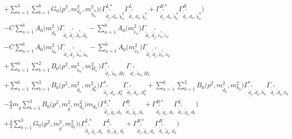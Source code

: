 \begin{itemize}
\begin{align}
 &+\sum_{a=1}^{3}\sum_{b=1}^{6}{G_0\Big(p^{2},m^2_{d_{{a}}},m^2_{\tilde{\chi}^0_{{b}}}\Big)} \Big({\Gamma^{L*}_{\check{\tilde{d}}^*_{{j}},d_{{a}},\tilde{\chi}^0_{{b}}}} {\Gamma^L_{\check{\tilde{d}}^*_{{i}},d_{{a}},\tilde{\chi}^0_{{b}}}}  + {\Gamma^{R*}_{\check{\tilde{d}}^*_{{j}},d_{{a}},\tilde{\chi}^0_{{b}}}} {\Gamma^R_{\check{\tilde{d}}^*_{{i}},d_{{a}},\tilde{\chi}^0_{{b}}}} \Big)\nonumber \\ 
 &- C \sum_{a=1}^{6}{A_0\Big(m^2_{\tilde{d}_{{a}}}\Big)} {\Gamma_{\check{\tilde{d}}_{{i}},\check{\tilde{d}}^*_{{j}},\tilde{d}^*_{{a}},\tilde{d}_{{a}}}}  - \sum_{a=1}^{6}{A_0\Big(m^2_{\tilde{e}_{{a}}}\Big)} {\Gamma_{\check{\tilde{d}}_{{i}},\check{\tilde{d}}^*_{{j}},\tilde{e}^*_{{a}},\tilde{e}_{{a}}}}  \nonumber \\ 
 &- C \sum_{a=1}^{6}{A_0\Big(m^2_{\tilde{u}_{{a}}}\Big)} {\Gamma_{\check{\tilde{d}}_{{i}},\check{\tilde{d}}^*_{{j}},\tilde{u}^*_{{a}},\tilde{u}_{{a}}}}  - \sum_{a=1}^{6}{A_0\Big(m^2_{\tilde{\nu}_{{a}}}\Big)} {\Gamma_{\check{\tilde{d}}_{{i}},\check{\tilde{d}}^*_{{j}},\tilde{\nu}^*_{{a}},\tilde{\nu}_{{a}}}}  \nonumber \\ 
 &+\sum_{a=1}^{6}\sum_{b=1}^{2}{B_0\Big(p^{2},m^2_{\tilde{u}_{{a}}},m^2_{H^-_{{b}}}\Big)} {\Gamma^*_{\check{\tilde{d}}^*_{{j}},\tilde{u}_{{a}},H^-_{{b}}}} {\Gamma_{\check{\tilde{d}}^*_{{i}},\tilde{u}_{{a}},H^-_{{b}}}} \nonumber \\ 
 &+\sum_{a=1}^{6}\sum_{b=1}^{3}{B_0\Big(p^{2},m^2_{\tilde{d}_{{a}}},m^2_{A^0_{{b}}}\Big)} {\Gamma^*_{\check{\tilde{d}}^*_{{j}},\tilde{d}_{{a}},A^0_{{b}}}} {\Gamma_{\check{\tilde{d}}^*_{{i}},\tilde{d}_{{a}},A^0_{{b}}}} +\sum_{a=1}^{6}\sum_{b=1}^{3}{B_0\Big(p^{2},m^2_{\tilde{d}_{{a}}},m^2_{h_{{b}}}\Big)} {\Gamma^*_{\check{\tilde{d}}^*_{{j}},\tilde{d}_{{a}},h_{{b}}}} {\Gamma_{\check{\tilde{d}}^*_{{i}},\tilde{d}_{{a}},h_{{b}}}} \nonumber \\ 
 &-\frac{8}{3} m_{\tilde{g}} \sum_{b=1}^{3}{B_0\Big(p^{2},m^2_{\tilde{g}},m^2_{d_{{b}}}\Big)} m_{d_{{b}}} \Big({\Gamma^{L*}_{\check{\tilde{d}}^*_{{j}},\tilde{g}_{{1}},d_{{b}}}} {\Gamma^R_{\check{\tilde{d}}^*_{{i}},\tilde{g}_{{1}},d_{{b}}}}  + {\Gamma^{R*}_{\check{\tilde{d}}^*_{{j}},\tilde{g}_{{1}},d_{{b}}}} {\Gamma^L_{\check{\tilde{d}}^*_{{i}},\tilde{g}_{{1}},d_{{b}}}} \Big) \nonumber \\ 
 &+\frac{4}{3} \sum_{b=1}^{3}{G_0\Big(p^{2},m^2_{\tilde{g}},m^2_{d_{{b}}}\Big)} \Big({\Gamma^{L*}_{\check{\tilde{d}}^*_{{j}},\tilde{g}_{{1}},d_{{b}}}} {\Gamma^L_{\check{\tilde{d}}^*_{{i}},\tilde{g}_{{1}},d_{{b}}}}  + {\Gamma^{R*}_{\check{\tilde{d}}^*_{{j}},\tilde{g}_{{1}},d_{{b}}}} {\Gamma^R_{\check{\tilde{d}}^*_{{i}},\tilde{g}_{{1}},d_{{b}}}} \Big) \nonumber \\ 

\end{align}
\end{itemize}
